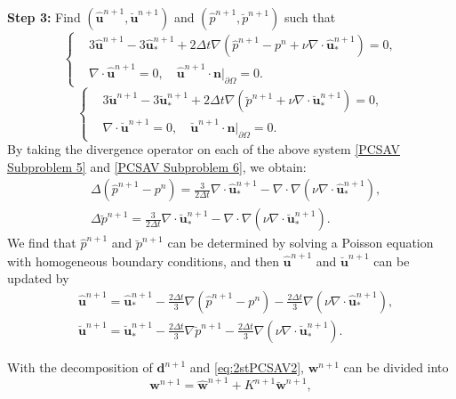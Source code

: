 \documentclass[12pt,reqno]{amsart}
\numberwithin{equation}{section}
\newcommand{\uu}{\mathrm{\textbf{u}}}
\newcommand{\dd}{\mathrm{\textbf{d}}}
\newcommand{\ww}{\mathrm{\textbf{w}}}
\newcommand{\nn}{\textbf{n}}
\begin{document}
\textbf{Step 3:} Find $(\hat{\uu}^{n+1},\breve{\uu}^{n+1})$ and $(\hat{p}^{n+1},\breve{p}^{n+1})$ such that
\begin{equation}\label{PCSAV Subproblem 5}
\left\{\begin{aligned}
&3\hat{\uu}^{n+1}-3\hat{\uu}_*^{n+1}+
2\Delta t\nabla\left(\hat{p}^{n+1}-p^n+\nu\nabla\cdot\hat{\uu}_*^{n+1}\right)
= 0,\\
&\nabla\cdot\hat{\uu}^{n+1}=0,\quad \hat{\uu}^{n+1}\cdot\nn|_{\partial\Omega}=0.
\end{aligned}\right.
\end{equation}
\begin{equation}\label{PCSAV Subproblem 6}
\left\{\begin{aligned}
&3\breve{\uu}^{n+1}-3\breve{\uu}_*^{n+1}+
2\Delta t\nabla\left(\breve{p}^{n+1}+\nu\nabla\cdot\breve{\uu}_*^{n+1}\right)
= 0,\\
&\nabla\cdot\breve{\uu}^{n+1}=0,\quad \breve{\uu}^{n+1}\cdot\nn|_{\partial\Omega}=0.
\end{aligned}\right.
\end{equation}
By taking the divergence operator on each of the above system \eqref{PCSAV Subproblem 5} and \eqref{PCSAV Subproblem 6}, we obtain:
\begin{align}
&\Delta\left(\hat{p}^{n+1}-p^n\right)=\frac{3}{2\Delta t}\nabla\cdot\hat{\uu}_*^{n+1}-\nabla\cdot\nabla\left(\nu\nabla\cdot\hat{\uu}_*^{n+1}\right),\label{BDFphat}\\
&\Delta\breve{p}^{n+1}=\frac{3}{2\Delta t}\nabla\cdot\breve{\uu}_*^{n+1}
-\nabla\cdot\nabla\left(\nu\nabla\cdot\breve{\uu}_*^{n+1}\right).\label{BDFpbreve}
\end{align}
We find that $\hat{p}^{n+1}$ and $\breve{p}^{n+1}$ can be determined by solving a Poisson equation with homogeneous boundary conditions, and then $\hat{\uu}^{n+1}$ and  $\breve{\uu}^{n+1}$ can be updated by
\begin{align}
&\hat{\uu}^{n+1}=\hat{\uu}_*^{n+1}-\frac{2\Delta t}{3}\nabla\left(\hat{p}^{n+1}-p^n\right)
-\frac{2\Delta t}{3}\nabla\left(\nu\nabla\cdot\hat{\uu}_*^{n+1}\right),\label{BDFuhat}\\
&\breve{\uu}^{n+1}=\breve{\uu}_*^{n+1}-\frac{2\Delta t}{3}\nabla\breve{p}^{n+1}
-\frac{2\Delta t}{3}\nabla\left(\nu\nabla\cdot\breve{\uu}_*^{n+1}\right).\label{BDFubreve}
\end{align}

With the decomposition of $\dd^{n+1}$ and \eqref{eq:2stPCSAV2}, $\ww^{n+1}$ can be divided into
\begin{equation}\label{eqw}
\ww^{n+1} = \hat{\ww}^{n+1} + K^{n+1}\breve{\ww}^{n+1},
\end{equation}
\end{document}
